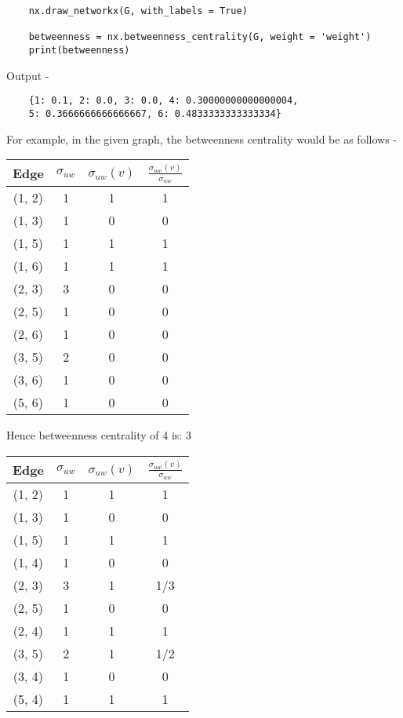 \documentclass{article}
\begin{document}
\begin{itemize}
\begin{verbatim}
    nx.draw_networkx(G, with_labels = True)

    betweenness = nx.betweenness_centrality(G, weight = 'weight')
    print(betweenness)  
\end{verbatim}

Output - 

\begin{verbatim}
    {1: 0.1, 2: 0.0, 3: 0.0, 4: 0.30000000000000004, 
    5: 0.3666666666666667, 6: 0.4833333333333334}
\end{verbatim}

For example, in the given graph, the betweenness centrality would be as follows -

\begin{center}
\begin{tabular}{|c|c|c|c|}
    \hline
    Edge & $\sigma_{uw}$ & $\sigma_{uw}(v)$ & $\frac{\sigma_{uw}(v)}{\sigma_{uw}}$ \\
    \hline
    (1, 2) & 1 & 1 & 1 \\
    (1, 3) & 1 & 0 & 0 \\
    (1, 5) & 1 & 1 & 1 \\
    (1, 6) & 1 & 1 & 1 \\
    (2, 3) & 3 & 0 & 0 \\
    (2, 5) & 1 & 0 & 0 \\
    (2, 6) & 1 & 0 & 0 \\
    (3, 5) & 2 & 0 & 0 \\
    (3, 6) & 1 & 0 & 0 \\
    (5, 6) & 1 & 0 & 0 \\
    \hline
\end{tabular}    
\end{center}

Hence betweenness centrality of 4 is: 3

\begin{center}
\begin{tabular}{|c|c|c|c|}
    \hline
    Edge & $\sigma_{uw}$ & $\sigma_{uw}(v)$ & $\frac{\sigma_{uw}(v)}{\sigma_{uw}}$ \\
    \hline
    (1, 2) & 1 & 1 & 1 \\
    (1, 3) & 1 & 0 & 0 \\
    (1, 5) & 1 & 1 & 1 \\
    (1, 4) & 1 & 0 & 0 \\
    (2, 3) & 3 & 1 & 1/3 \\
    (2, 5) & 1 & 0 & 0 \\
    (2, 4) & 1 & 1 & 1 \\
    (3, 5) & 2 & 1 & 1/2 \\
    (3, 4) & 1 & 0 & 0 \\
    (5, 4) & 1 & 1 & 1 \\
    \hline
\end{tabular}    
\end{center}


\end{itemize}
\end{document}
